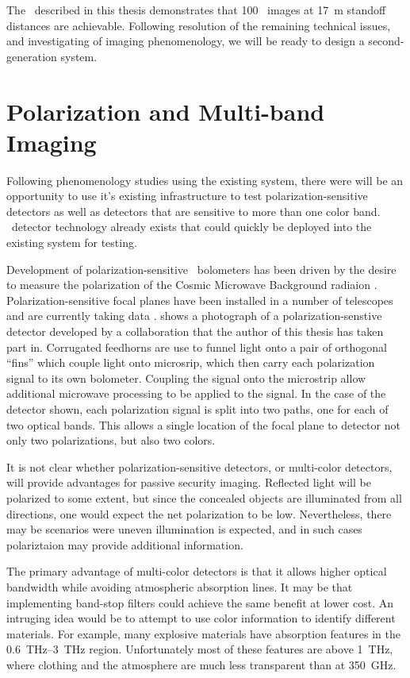 The \Imager\ described in this thesis demonstrates that \SI{100}{\mK} \NETD\ images at \SI{17}{\m} standoff distances are achievable.
Following resolution of the remaining technical issues, and investigating of imaging phenomenology, we will be ready to design a second-generation system.

\section{Polarization and Multi-band Imaging}

Following phenomenology studies using the existing system, there were will be an opportunity to use it's existing infrastructure to test polarization-sensitive detectors as well as detectors that are sensitive to more than one color band.
\TES\ detector technology already exists that could quickly be deployed into the existing system for testing.

Development of polarization-sensitive \TES\ bolometers has been driven by the desire to measure the polarization of the Cosmic Microwave Background radiaion \cite{decadel?}.
Polarization-sensitive focal planes have been installed in a number of telescopes and are currently taking data \cite{xxx}.
 shows a photograph of a polarization-senstive detector developed by a collaboration that the author of this thesis has taken part in.
Corrugated feedhorns are use to funnel light onto a pair of orthogonal ``fins'' which couple light onto microsrip, which then carry each polarization signal to its own bolometer.
Coupling the signal onto the microstrip allow additional microwave processing to be applied to the signal.
In the case of the detector shown, each polarization signal is split into two paths, one for each of two optical bands.
This allows a single location of the focal plane to detector not only two polarizations, but also two colors.

It is not clear whether polarization-sensitive detectors, or multi-color detectors, will provide advantages for passive security imaging.
Reflected light will be polarized to some extent, but since the concealed objects are illuminated from all directions, one would expect the net polarization to be low.
Nevertheless, there may be scenarios were uneven illumination is expected, and in such cases polariztaion may provide additional information.

The primary advantage of multi-color detectors is that it allows higher optical bandwidth while avoiding atmospheric absorption lines.
It may be that implementing band-stop filters could achieve the same benefit at lower cost.
An intruging idea would be to attempt to use color information to identify different materials.
For example, many explosive materials have absorption features in the \SIrange{0.6}{3}{\THz} region.
Unfortunately most of these features are above \SI{1}{\THz}, where clothing and the atmosphere are much less transparent than at \SI{350}{\GHz}.

